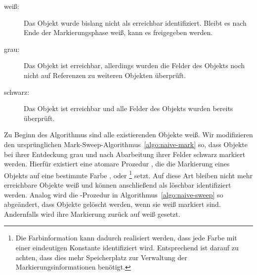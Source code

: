 \begin{description}
	\item[weiß:] Das Objekt wurde bislang nicht als erreichbar identifiziert.
		Bleibt es nach Ende der Markierungsphase weiß, kann es freigegeben werden.
	\item[grau:] Das Objekt ist erreichbar, allerdings wurden die Felder des Objekts noch nicht auf Referenzen zu weiteren Objekten überprüft.
	\item[schwarz:] Das Objekt ist erreichbar und alle Felder des Objekts wurden bereits überprüft.
\end{description}

Zu Beginn des Algorithmus sind alle existierenden Objekte weiß.
Wir modifizieren den ursprünglichen Mark-Sweep-Algorithmus~\ref{algo:naive-mark} so, dass Objekte bei ihrer Entdeckung grau und nach Abarbeitung ihrer Felder schwarz markiert werden.
Hierfür existiert eine atomare Prozedur , die die Markierung eines Objekts auf eine bestimmte Farbe ,  oder \footnote{Die Farbinformation kann dadurch realisiert werden, dass jede Farbe mit einer eindeutigen Konstante identifiziert wird. Entsprechend ist darauf zu achten, dass dies mehr Speicherplatz zur Verwaltung der Markierungsinformationen benötigt.} setzt.
Auf diese Art bleiben nicht mehr erreichbare Objekte weiß und können anschließend als löschbar identifiziert werden.
Analog wird die -Prozedur in Algorithmus~\ref{algo:naive-sweep} so abgeändert, dass Objekte gelöscht werden, wenn sie weiß markiert sind.
Andernfalls wird ihre Markierung zurück auf weiß gesetzt.

